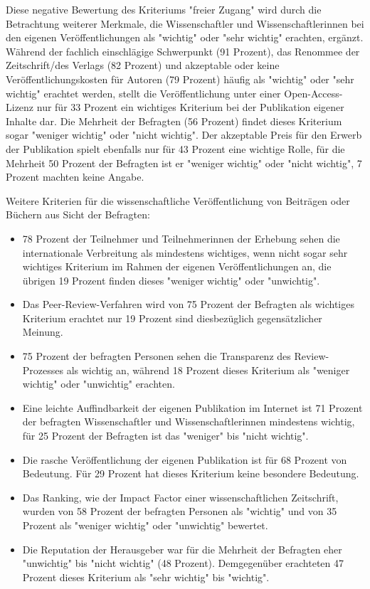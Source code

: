 Diese negative Bewertung des Kriteriums "freier Zugang" wird durch die Betrachtung weiterer Merkmale, die Wissenschaftler und Wissenschaftlerinnen bei den eigenen Veröffentlichungen als "wichtig" oder "sehr wichtig" erachten, ergänzt. Während der fachlich einschlägige Schwerpunkt (91 Prozent), das Renommee der Zeitschrift/des Verlags (82 Prozent) und akzeptable oder keine Veröffentlichungskosten für Autoren (79 Prozent) häufig als "wichtig" oder "sehr wichtig" erachtet werden, stellt die Veröffentlichung unter einer Open-Access-Lizenz nur für 33 Prozent ein wichtiges Kriterium bei der Publikation eigener Inhalte dar. Die Mehrheit der Befragten (56 Prozent) findet dieses Kriterium sogar "weniger wichtig" oder "nicht wichtig". Der akzeptable Preis für den Erwerb der Publikation spielt ebenfalls nur für 43 Prozent eine wichtige Rolle, für die Mehrheit 50 Prozent der Befragten ist er "weniger wichtig" oder "nicht wichtig", 7 Prozent machten keine Angabe.

Weitere Kriterien für die wissenschaftliche Veröffentlichung von Beiträgen oder Büchern aus Sicht der Befragten:
\begin{itemize}
\item 78 Prozent der Teilnehmer und Teilnehmerinnen der Erhebung sehen die internationale Verbreitung als mindestens wichtiges, wenn nicht sogar sehr wichtiges Kriterium im Rahmen der eigenen Veröffentlichungen an, die übrigen 19 Prozent finden dieses "weniger wichtig" oder "unwichtig".
\item Das Peer-Review-Verfahren wird von 75 Prozent der Befragten als wichtiges Kriterium erachtet nur 19 Prozent sind diesbezüglich gegensätzlicher Meinung.
\item 75 Prozent der befragten Personen sehen die Transparenz des Review-Prozesses als wichtig an, während 18 Prozent dieses Kriterium als "weniger wichtig" oder "unwichtig" erachten.
\item Eine leichte Auffindbarkeit der eigenen Publikation im Internet ist 71 Prozent der befragten Wissenschaftler und Wissenschaftlerinnen mindestens wichtig, für 25 Prozent der Befragten ist das "weniger" bis "nicht wichtig".
\item Die rasche Veröffentlichung der eigenen Publikation ist für 68 Prozent von Bedeutung. Für 29 Prozent hat dieses Kriterium keine besondere Bedeutung.
\item Das Ranking, wie der Impact Factor einer wissenschaftlichen Zeitschrift, wurden von 58 Prozent der befragten Personen als "wichtig" und von 35 Prozent als "weniger wichtig" oder "unwichtig" bewertet.
\item Die Reputation der Herausgeber war für die Mehrheit der Befragten eher "unwichtig" bis "nicht wichtig" (48 Prozent). Demgegenüber erachteten 47 Prozent dieses Kriterium als "sehr wichtig" bis "wichtig".
\end{itemize}

